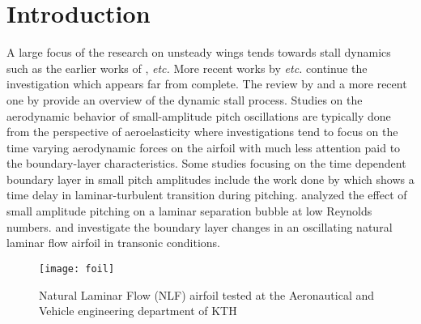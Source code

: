 

\section{Introduction}

A large focus of the research on unsteady wings tends towards stall dynamics such as the earlier works of \cite{mccroskey81,mccroskey82experimental,mccroskey73,mccroskey76,carr1977,ericsson_stall88a,ericsson_stall88b}, \emph{etc.} More recent works by \cite{dunne2015,rival2010,choudhry14,visbal11,visbal14,visbal17,alferez13,rosti16} \emph{etc.} continue the investigation which appears far from complete. The review by \cite{mccroskey82} and a more recent one by \cite{coorke15} provide an overview of the dynamic stall process. Studies on the aerodynamic behavior of small-amplitude pitch oscillations are typically done from the perspective of aeroelasticity where investigations tend to focus on the time varying aerodynamic forces on the airfoil with much less attention paid to the boundary-layer characteristics. Some studies focusing on the time dependent boundary layer in small pitch amplitudes include the work done by \cite{pascazio96} which shows a time delay in laminar-turbulent transition during pitching. \cite{nati15} analyzed the effect of small amplitude pitching on a laminar separation bubble at low Reynolds numbers. \cite{mai11} and \cite{hebler13} investigate the boundary layer changes in an oscillating natural laminar flow airfoil in transonic conditions. 
\begin{figure}[h]
	\centering
	\texttt{[image: foil]}
	\caption{Natural Laminar Flow (NLF) airfoil tested at the Aeronautical and Vehicle engineering department of KTH \citep{lokatt17,lokattthesis}}
	\label{fig:foil_david}
\end{figure}
